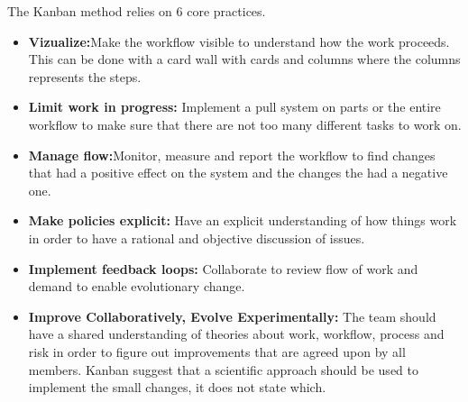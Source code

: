 The Kanban method relies on 6 core practices.
\begin{itemize}
\item{}\textbf{Vizualize:}Make the workflow visible to understand how the work proceeds. This can be done with a card wall with cards and columns where the columns represents the steps. 
\item{}\textbf{Limit work in progress:} Implement a pull system on parts or the entire workflow to make sure that there are not too many different tasks to work on.
\item{}\textbf{Manage flow:}Monitor, measure and report the workflow to find changes that had a positive effect on the system and the changes the had a negative one.
\item{}\textbf{Make policies explicit:} Have an explicit understanding of how things work in order to have a rational and objective discussion of issues. 
\item{}\textbf{Implement feedback loops:} Collaborate to review flow of work and demand to enable evolutionary change. 
\item{}\textbf{Improve Collaboratively, Evolve Experimentally:} The team should have a shared understanding of theories about work, workflow, process and risk in order to figure out improvements that are agreed upon by all members. 
Kanban suggest that a scientific approach should be used to implement the small changes, it does not state which.
\end{itemize}

